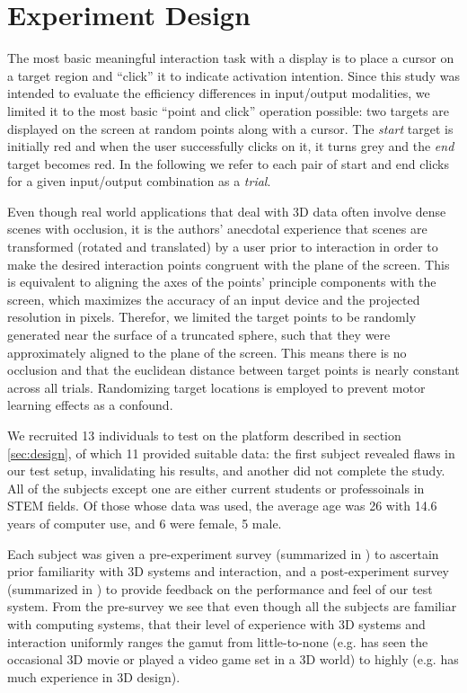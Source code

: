 \section{Experiment Design}\label{sec:experiment}

The most basic meaningful interaction task with a display is to place a cursor
on a target region and ``click'' it to indicate activation intention.  Since
this study was intended to evaluate the efficiency differences in input/output
modalities, we limited it to the most basic ``point and click'' operation
possible: two targets are displayed on the screen at random points along with
a cursor.  The \emph{start} target is initially red and when the user
successfully clicks on it, it turns grey and the \emph{end} target becomes
red.  In the following we refer to each pair of start and end clicks for a
given input/output combination as a \emph{trial}.

Even though real world applications that deal with 3D data often involve dense
scenes with occlusion, it is the authors' anecdotal experience that scenes are
transformed (rotated and translated) by a user prior to interaction in order
to make the desired interaction points congruent with the plane of the screen.
This is equivalent to aligning the axes of the points' principle components
with the screen, which maximizes the accuracy of an input device and the
projected resolution in pixels.  Therefor, we limited the target points to be
randomly generated near the surface of a truncated sphere, such that they were
approximately aligned to the plane of the screen.  This means there is no
occlusion and that the euclidean distance between target points is nearly
constant across all trials.  Randomizing target locations is employed to
prevent motor learning effects as a confound.

We recruited 13 individuals to test on the platform described in section
\ref{sec:design}, of which 11 provided suitable data: the first subject
revealed flaws in our test setup, invalidating his results, and another did
not complete the study.  All of the subjects except one are either current
students or professoinals in STEM fields.  Of those whose data was used, the
average age was 26 with 14.6 years of computer use, and 6 were female, 5 male.

Each subject was given a pre-experiment survey (summarized in
) to ascertain prior familiarity with 3D systems and
interaction, and a post-experiment survey (summarized in ) to
provide feedback on the performance and feel of our test system.  From the
pre-survey we see that even though all the subjects are familiar with
computing systems, that their level of experience with 3D systems and
interaction uniformly ranges the gamut from little-to-none (e.g. has seen the
occasional 3D movie or played a video game set in a 3D world) to highly
(e.g. has much experience in 3D design).

